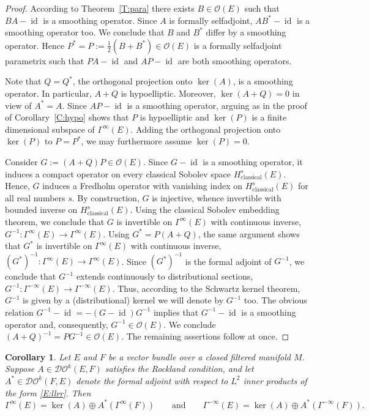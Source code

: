 \documentclass[reqno,12pt]{amsart}
\DeclareMathOperator{\id}{id}
\newcommand{\DO}{\mathcal D\mathcal O}
\newcommand\cl{\textrm{classical}}
\theoremstyle{plain}
\newtheorem{corollary}[theorem]{Corollary}
\theoremstyle{definition}
\begin{document}
\begin{proof}
According to Theorem~\ref{T:para} there exists $B\in\mathcal O(E)$ such that $BA-\id$ is a smoothing operator.
Since $A$ is formally selfadjoint, $AB^*-\id$ is a smoothing operator too.
We conclude that $B$ and $B^*$ differ by a smoothing operator.
Hence $P^*=P:=\tfrac12(B+B^*)\in\mathcal O(E)$ is a formally selfadjoint parametrix such that $PA-\id$ and $AP-\id$ are both smoothing operators.


Note that $Q=Q^*$, the orthogonal projection onto $\ker(A)$, is a smoothing operator.
In particular, $A+Q$ is hypoelliptic.
Moreover, $\ker(A+Q)=0$ in view of $A^*=A$.
Since $AP-\id$ is a smoothing operator, arguing as in the proof of Corollary~\ref{C:hypo} shows that $P$ is hypoelliptic and $\ker(P)$ is a finite dimensional subspace of $\Gamma^\infty(E)$.
Adding the orthogonal projection onto $\ker(P)$ to $P=P^*$, we may furthermore assume $\ker(P)=0$.


Consider $G:=(A+Q)P\in\mathcal O(E)$.
Since $G-\id$ is a smoothing operator, it induces a compact operator on every classical Sobolev space $H^s_\cl(E)$.
Hence, $G$ induces a Fredholm operator with vanishing index on $H^s_\cl(E)$ for all real numbers $s$.
By construction, $G$ is injective, whence invertible with bounded inverse on $H^s_\cl(E)$.
Using the classical Sobolev embedding theorem, we conclude that $G$ is invertible on $\Gamma^\infty(E)$ with continuous inverse, $G^{-1}\colon\Gamma^\infty(E)\to\Gamma^\infty(E)$.
Using $G^*=P(A+Q)$, the same argument shows that $G^*$ is invertible on $\Gamma^\infty(E)$ with continuous inverse, $(G^*)^{-1}\colon\Gamma^\infty(E)\to\Gamma^\infty(E)$.
Since $(G^*)^{-1}$ is the formal adjoint of $G^{-1}$, we conclude that $G^{-1}$ extends continuously to distributional sections, $G^{-1}\colon\Gamma^{-\infty}(E)\to\Gamma^{-\infty}(E)$.
Thus, according to the Schwartz kernel theorem, $G^{-1}$ is given by a (distributional) kernel we will denote by $G^{-1}$ too.
The obvious relation $G^{-1}-\id=-(G-\id)G^{-1}$ implies that $G^{-1}-\id$ is a smoothing operator and, consequently, $G^{-1}\in\mathcal O(E)$.
We conclude $(A+Q)^{-1}=PG^{-1}\in\mathcal O(E)$.
The remaining assertions follow at once.
\end{proof}


\begin{corollary}\label{C:smhe}
Let $E$ and $F$ be a vector bundle over a closed filtered manifold $M$.
Suppose $A\in\DO^k(E,F)$ satisfies the Rockland condition, and let $A^*\in\DO^k(F,E)$ denote the formal adjoint with respect to $L^2$ inner products of the form \eqref{E:llrr}.
Then
$$
\Gamma^\infty(E)=\ker(A)\oplus A^*(\Gamma^\infty(F))\qquad\text{and}\qquad
\Gamma^{-\infty}(E)=\ker(A)\oplus A^*(\Gamma^{-\infty}(F)).
$$
\end{corollary}
\end{document}
